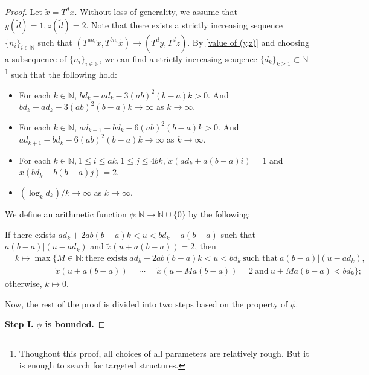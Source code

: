 \documentclass[reqno,12pt]{amsart}
\def \N {\mathbb N}
\numberwithin{equation}{section}
\begin{document}
\begin{proof}
	Let $\tilde{x}=T^{\tilde{d}}x$. Without loss of generality, we assume that $y(\tilde{d})=1,z(\tilde{d})=2$. Note that there exists a strictly increasing sequence $\{n_i\}_{i\in \N}$ such that $(T^{an_i}\tilde{x},T^{bn_i}\tilde{x})\rightarrow (T^{\tilde{d}}y,T^{\tilde{d}}z)$.
By \eqref{value of (y,z)} and choosing a subsequence of $\{n_i\}_{i\in \N}$,  we can find a strictly increasing seuqence $\{d_k\}_{k\ge 1}\subset \N$\footnote{Thoughout this proof, all choices of all parameters are relatively rough. But it is enough to search for targeted structures.} such that the following hold:
	\begin{itemize}
		\item For each $k\in \N$, $bd_{k}-ad_{k}-3(ab)^{2}(b-a)k>0$. And $bd_{k}-ad_{k}-3(ab)^{2}(b-a)k\to \infty$ as $k\to\infty$.
		\item For each $k\in \N$, $ad_{k+1}-bd_{k}-6(ab)^{2}(b-a)k>0$. And $ad_{k+1}-bd_{k}-6(ab)^{2}(b-a)k\to\infty$ as $k\to\infty$.
		\item For each $k\in \N,1\le i\le ak,1\le j\le 4bk$, $\tilde{x}(ad_{k}+a(b-a)i)=1$ and $\tilde{x}(bd_{k}+b(b-a)j)=2$.
          \item $(\log_{k}d_k)/k\to \infty$ as $k\to\infty$.
	\end{itemize}
	We define an arithmetic function $\phi:\N\to \N\cup \{0\} $ by the following:
	
	If there exists $ad_{k}+2ab(b-a)k<u<bd_k-a(b-a)$ such that $a(b-a)|(u-ad_{k})$ and $\tilde{x}(u+a(b-a))=2$, then
	\begin{align*}
	& k\mapsto\max\{M\in \N:\text{there exists}\ ad_{k}+2ab(b-a)k< u<bd_{k}\ \text{such that}\ a(b-a)|(u-ad_{k}),
	\\ & \hspace{2cm} \tilde{x}(u+a(b-a))=\cdots=\tilde{x}(u+Ma(b-a))=2\ \text{and}\ u+Ma(b-a)<bd_k\};
	\end{align*} otherwise, $k\mapsto 0$.
	
	Now, the rest of the proof is divided into two steps based on the property of $\phi$.
	
	\noindent \textbf{Step I. $\phi$ is bounded.}
	

\end{proof}
\end{document}
